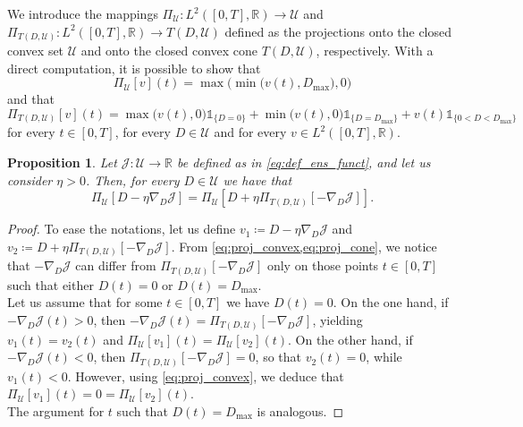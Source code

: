 \documentclass[a4paper,12pt, reqno]{amsart}
\theoremstyle{plain}
\newtheorem{proposition}[theorem]{Proposition}
\theoremstyle{definition}
\theoremstyle{remark}
\numberwithin{equation}{section}
\newcommand{\J}{\mathcal{J}}
\newcommand{\R}{\mathbb{R}}
\newcommand{\U}{\mathcal{U}}
\begin{document}
We introduce the mappings $\Pi_\U \colon L^2([0,T],\R) \to \U$ and $\Pi_{T({D},\U)} \colon L^2([0,T],\R) \to T({D},\U)$ defined as the projections onto the closed convex set $\U$ and onto the closed convex cone $T({D},\U)$, respectively.
With a direct computation, it is possible to show that
\begin{equation} \label{eq:proj_convex}
    \Pi_\U[v]({t}) = \max\big(\min\big( v({t}), {D_{\max}}\big), 0\big)
\end{equation}
and that
\begin{equation} \label{eq:proj_cone}
    \Pi_{T({D},\U)}[v]({t}) =   \max\big( v({t}), 0 \big) \mathds{1}_{\{{D}=0\}} + 
    \min\big( v({t}), 0 \big) \mathds{1}_{\{{D}={D_{\max}}\}}
    + v({t})\mathds{1}_{\{0<{D}<{D_{\max}}\}}
\end{equation}
for every ${t}\in[0,T]$, for every ${D}\in \U$ and for every $v\in L^2([0,T],\R)$.

\begin{proposition} \label{prop:g_descent}
    Let $\J\colon \U\to \R$ be defined as in \cref{eq:def_ens_funct}, and let us consider $\eta>0$. Then, for every ${D}\in \U$ we have that
    \begin{equation*}
        \Pi_\U\left[ {D} - \eta \nabla_{D} \J \right] =
        \Pi_\U\left[ {D} + \eta \Pi_{T({D},\U)} [-\nabla_{D} \J] \right].
    \end{equation*}
\end{proposition}
\begin{proof}
    To ease the notations, let us define $v_1 \coloneqq {D} - \eta \nabla_{D} \J$ and $v_2 \coloneqq {D} + \eta \Pi_{T({D},\U)} [-\nabla_{D} \J]$.
    From \cref{eq:proj_convex,eq:proj_cone}, we notice that $-\nabla_{D} \J$ can differ from $\Pi_{T({D},\U)} [-\nabla_{D} \J]$ only on those points ${t}\in[0,T]$ such that either ${D}({t})=0$ or ${D}({t})={D_{\max}}$. \\
    Let us assume that for some ${t}\in[0,T]$ we have ${D}({t})=0$. On the one hand, if $-\nabla_{D} \J({t})>0$, then $-\nabla_{D} \J({t}) = \Pi_{T({D},\U)} [-\nabla_{D} \J]$, yielding $v_1({t})=v_2({t})$ and $\Pi_\U[v_1]({t})= \Pi_\U[v_2]({t})$.
    On the other hand, if $-\nabla_{D} \J({t})<0$, then $\Pi_{T({D},\U)} [-\nabla_{D} \J]=0$, so that $v_2({t})=0$, while $v_1({t})<0$. However, using \cref{eq:proj_convex}, we deduce that $\Pi_\U[v_1]({t})= 0 = \Pi_\U[v_2]({t})$. \\
    The argument for ${t}$ such that ${D}({t})={D_{\max}}$ is analogous.
\end{proof}
\end{document}
